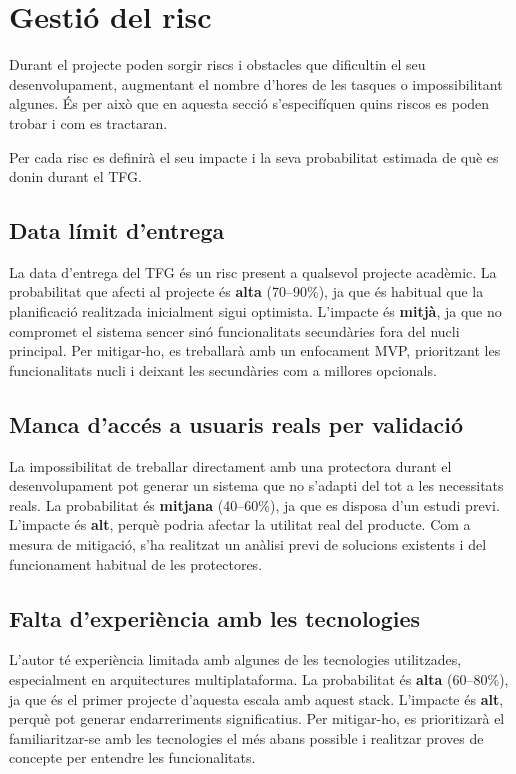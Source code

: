 \documentclass[11pt,a4paper]{report}
\begin{document}
\section{Gestió del risc}
Durant el projecte poden sorgir riscs i obstacles que dificultin el seu desenvolupament, augmentant el nombre d'hores de les tasques o impossibilitant algunes. És per això que en aquesta secció s'especifíquen quins riscos es poden trobar i com es tractaran.

Per cada risc es definirà el seu impacte i la seva probabilitat estimada de què es donin durant el TFG.

\subsection{Data límit d'entrega}
La data d'entrega del TFG és un risc present a qualsevol projecte acadèmic. La probabilitat que afecti al projecte és \textbf{alta} (70--90\%), ja que és habitual que la planificació realitzada inicialment sigui optimista. L'impacte és \textbf{mitjà}, ja que no compromet el sistema sencer sinó funcionalitats secundàries fora del nucli principal. Per mitigar-ho, es treballarà amb un enfocament MVP, prioritzant les funcionalitats nucli i deixant les secundàries com a millores opcionals.

\subsection{Manca d'accés a usuaris reals per validació}
La impossibilitat de treballar directament amb una protectora durant el desenvolupament pot generar un sistema que no s'adapti del tot a les necessitats reals. La probabilitat és \textbf{mitjana} (40--60\%), ja que es disposa d'un estudi previ. L'impacte és \textbf{alt}, perquè podria afectar la utilitat real del producte. Com a mesura de mitigació, s'ha realitzat un anàlisi previ de solucions existents i del funcionament habitual de les protectores.

\subsection{Falta d'experiència amb les tecnologies}
L'autor té experiència limitada amb algunes de les tecnologies utilitzades, especialment en arquitectures multiplataforma. La probabilitat és \textbf{alta} (60--80\%), ja que és el primer projecte d'aquesta escala amb aquest stack. L'impacte és \textbf{alt}, perquè pot generar endarreriments significatius. Per mitigar-ho, es prioritizarà el familiaritzar-se amb les tecnologies el més abans possible i realitzar proves de concepte per entendre les funcionalitats.
\end{document}
